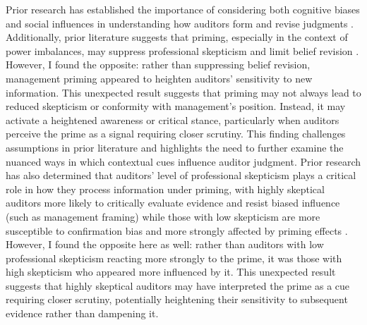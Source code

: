\documentclass[12pt,english]{article}
\begin{document}
Prior research has established the importance of considering both cognitive biases and social influences in understanding how auditors form and revise judgments \citep{loersch2016, bargh1996, zajonc1980, milgram1974}. Additionally, prior literature suggests that priming, especially in the context of power imbalances, may suppress professional skepticism and limit belief revision \citep{hammersley2010, bennett2013, casciaro2005}. However, I found the opposite: rather than suppressing belief revision, management priming appeared to heighten auditors’ sensitivity to new information. This unexpected result suggests that priming may not always lead to reduced skepticism or conformity with management’s position. Instead, it may activate a heightened awareness or critical stance, particularly when auditors perceive the prime as a signal requiring closer scrutiny. This finding challenges assumptions in prior literature and highlights the need to further examine the nuanced ways in which contextual cues influence auditor judgment. Prior research has also determined that auditors’ level of professional skepticism plays a critical role in how they process information under priming, with highly skeptical auditors more likely to critically evaluate evidence and resist biased influence (such as management framing) while those with low skepticism are more susceptible to confirmation bias and more strongly affected by priming effects \citep{hurtt2008, alexopoulos2012, mcmillian1993}. However, I found the opposite here as well: rather than auditors with low professional skepticism reacting more strongly to the prime, it was those with high skepticism who appeared more influenced by it. This unexpected result suggests that highly skeptical auditors may have interpreted the prime as a cue requiring closer scrutiny, potentially heightening their sensitivity to subsequent evidence rather than dampening it. 
\end{document}
